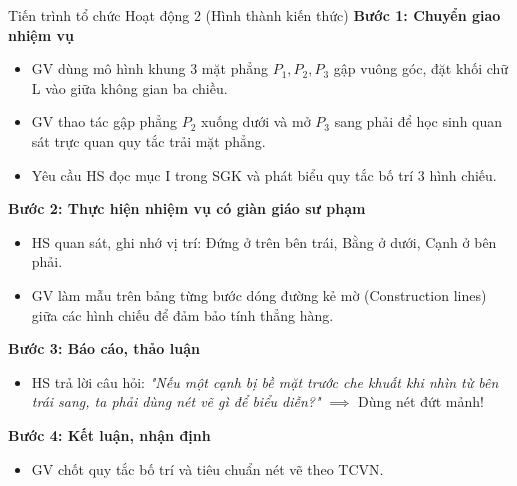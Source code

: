 \documentclass[12pt, a4paper]{article}
\begin{document}
\begin{pedabox}{Tiến trình tổ chức Hoạt động 2 (Hình thành kiến thức)}
    \textbf{Bước 1: Chuyển giao nhiệm vụ}
    \begin{itemize}[leftmargin=0.6cm]
        \item GV dùng mô hình khung 3 mặt phẳng $P_1, P_2, P_3$ gập vuông góc, đặt khối chữ L vào giữa không gian ba chiều.
        \item GV thao tác gập phẳng $P_2$ xuống dưới và mở $P_3$ sang phải để học sinh quan sát trực quan quy tắc trải mặt phẳng.
        \item Yêu cầu HS đọc mục I trong SGK và phát biểu quy tắc bố trí 3 hình chiếu.
    \end{itemize}

    \textbf{Bước 2: Thực hiện nhiệm vụ có giàn giáo sư phạm}
    \begin{itemize}[leftmargin=0.6cm]
        \item HS quan sát, ghi nhớ vị trí: Đứng ở trên bên trái, Bằng ở dưới, Cạnh ở bên phải.
        \item GV làm mẫu trên bảng từng bước dóng đường kẻ mờ (Construction lines) giữa các hình chiếu để đảm bảo tính thẳng hàng.
    \end{itemize}

    \textbf{Bước 3: Báo cáo, thảo luận}
    \begin{itemize}[leftmargin=0.6cm]
        \item HS trả lời câu hỏi: \textit{"Nếu một cạnh bị bề mặt trước che khuất khi nhìn từ bên trái sang, ta phải dùng nét vẽ gì để biểu diễn?"} $\implies$ Dùng nét đứt mảnh!
    \end{itemize}

    \textbf{Bước 4: Kết luận, nhận định}
    \begin{itemize}[leftmargin=0.6cm]
        \item GV chốt quy tắc bố trí và tiêu chuẩn nét vẽ theo TCVN.
    \end{itemize}
\end{pedabox}
\end{document}
